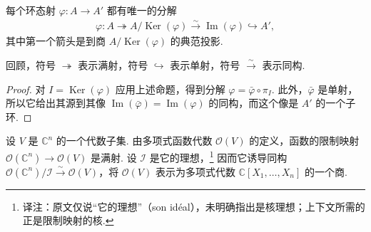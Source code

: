 \begin{corollary*}
每个环态射 $\varphi\colon A\longrightarrow A'$ 都有唯一的分解
\begin{align*}
\varphi\colon A\twoheadrightarrow A/\operatorname{Ker}(\varphi)
\xrightarrow{\sim}\operatorname{Im}(\varphi)\hookrightarrow A',
\end{align*}
其中第一个箭头是到商 $A/\operatorname{Ker}(\varphi)$ 的典范投影.
\end{corollary*}
回顾，符号 $\twoheadrightarrow$ 表示满射，符号 $\hookrightarrow$ 表示单射，符号 $\xrightarrow{\sim}$ 表示同构.
\begin{proof}
对 $I=\operatorname{Ker}(\varphi)$ 应用上述命题，得到分解 $\varphi=\bar\varphi\circ\pi_I$. 此外，$\bar\varphi$ 是单射，所以它给出其源到其像 $\operatorname{Im}(\bar\varphi)=\operatorname{Im}(\varphi)$ 的同构，而这个像是 $A'$ 的一个子环.
\end{proof}
\begin{example*}
设 $V$ 是 $\mathbb C^n$ 的一个代数子集. 由多项式函数代数 $\mathcal O(V)$ 的定义，函数的限制映射 $\mathcal O(\mathbb C^n)\longrightarrow\mathcal O(V)$ 是满射. 设 $\mathcal I$ 是它的理想，\footnote{译注：原文仅说``它的理想''（son idéal），未明确指出是核理想；上下文所需的正是限制映射的核.} 因而它诱导同构 $\mathcal O(\mathbb C^n)/\mathcal I\xrightarrow{\sim}\mathcal O(V)$，将 $\mathcal O(V)$ 表示为多项式代数 $\mathbb C[X_1,\ldots,X_n]$ 的一个商.
\end{example*}

